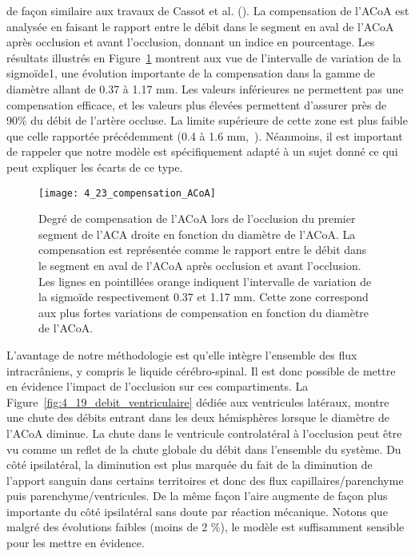 de façon similaire aux travaux de Cassot et al. (\cite{Cassot1995}). La compensation de l’ACoA est analysée en faisant
le rapport entre le débit dans le segment en aval de l’ACoA après occlusion et avant l’occlusion,
donnant un indice en pourcentage. Les résultats illustrés en Figure~\ref{fig:4_23_compensation_ACoA} montrent aux vue de l’intervalle
de variation de la sigmoïde1, une évolution importante de la compensation dans la gamme de diamètre
allant de 0.37 à 1.17 mm. Les valeurs inférieures ne permettent pas une compensation efficace, et les
valeurs plus élevées permettent d’assurer près de 90\% du débit de l’artère occluse. La limite supérieure
de cette zone est plus faible que celle rapportée précédemment (0.4 à 1.6 mm,~\cite{Cassot1995}). Néanmoins, il est
important de rappeler que notre modèle est spécifiquement adapté à un sujet donné ce qui peut
expliquer les écarts de ce type.\\
\begin{figure}[!t]
\centering
\texttt{[image: 4\_23\_compensation\_ACoA]}
\caption{ Degré de compensation de l'ACoA lors de l'occlusion du premier segment de l'ACA droite en fonction du diamètre
de l'ACoA. La compensation est représentée comme le rapport entre le débit dans le segment en aval de l’ACoA après
occlusion et avant l’occlusion. Les lignes en pointillées orange indiquent l’intervalle de variation de la sigmoïde
respectivement 0.37 et 1.17 mm. Cette zone correspond aux plus fortes variations de compensation en fonction du diamètre
de l’ACoA.}
\label{fig:4_23_compensation_ACoA}	
\end{figure}
L’avantage de notre méthodologie est qu’elle intègre l’ensemble des flux intracrâniens, y
compris le liquide cérébro-spinal. Il est donc possible de mettre en évidence l’impact de l’occlusion sur
ces compartiments. La Figure~\ref{fig:4_19_debit_ventriculaire} dédiée aux ventricules latéraux, montre une chute des débits entrant
dans les deux hémisphères lorsque le diamètre de l’ACoA diminue. La chute dans le ventricule
controlatéral à l’occlusion peut être vu comme un reflet de la chute globale du débit dans l’ensemble
du système. Du côté ipsilatéral, la diminution est plus marquée du fait de la diminution de l’apport
sanguin dans certains territoires et donc des flux capillaires/parenchyme puis parenchyme/ventricules.
De la même façon l’aire augmente de façon plus importante du côté ipsilatéral sans doute par réaction
mécanique. Notons que malgré des évolutions faibles (moins de 2 \%), le modèle est suffisamment
sensible pour les mettre en évidence.\\
